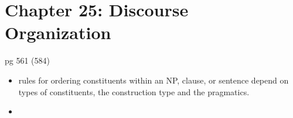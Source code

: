 \documentclass{article}
\begin{document}
\section{Chapter 25: Discourse Organization}
pg 561 (584)
\begin{itemize}
	\item rules for ordering constituents within an NP, clause, or sentence depend on types of constituents, the construction type and the pragmatics.
	\item
\end{itemize}
\end{document}
